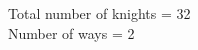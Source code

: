 \documentclass[preview]{standalone}
\begin{document}
\begin{center}
Total number of knights = 32 \\ Number of ways = 2
\end{center}
\end{document}
